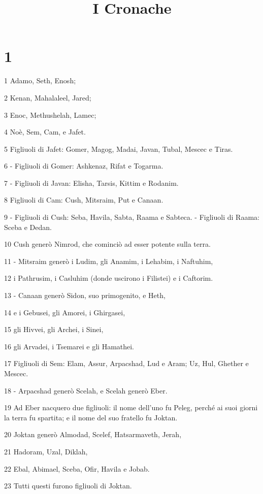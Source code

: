 

\title{I Cronache}


\chapter{1}

\par 1 Adamo, Seth, Enosh;
\par 2 Kenan, Mahalaleel, Jared;
\par 3 Enoc, Methushelah, Lamec;
\par 4 Noè, Sem, Cam, e Jafet.
\par 5 Figliuoli di Jafet: Gomer, Magog, Madai, Javan, Tubal, Mescec e Tiras.
\par 6 - Figliuoli di Gomer: Ashkenaz, Rifat e Togarma.
\par 7 - Figliuoli di Javan: Elisha, Tarsis, Kittim e Rodanim.
\par 8 Figliuoli di Cam: Cush, Mitsraim, Put e Canaan.
\par 9 - Figliuoli di Cush: Seba, Havila, Sabta, Raama e Sabteca. - Figliuoli di Raama: Sceba e Dedan.
\par 10 Cush generò Nimrod, che cominciò ad esser potente sulla terra.
\par 11 - Mitsraim generò i Ludim, gli Anamim, i Lehabim, i Naftuhim,
\par 12 i Pathrusim, i Casluhim (donde uscirono i Filistei) e i Caftorim.
\par 13 - Canaan generò Sidon, suo primogenito, e Heth,
\par 14 e i Gebusei, gli Amorei, i Ghirgasei,
\par 15 gli Hivvei, gli Archei, i Sinei,
\par 16 gli Arvadei, i Tsemarei e gli Hamathei.
\par 17 Figliuoli di Sem: Elam, Assur, Arpacshad, Lud e Aram; Uz, Hul, Ghether e Mescec.
\par 18 - Arpacshad generò Scelah, e Scelah generò Eber.
\par 19 Ad Eber nacquero due figliuoli: il nome dell'uno fu Peleg, perché ai suoi giorni la terra fu spartita; e il nome del suo fratello fu Joktan.
\par 20 Joktan generò Almodad, Scelef, Hatsarmaveth, Jerah,
\par 21 Hadoram, Uzal, Diklah,
\par 22 Ebal, Abimael, Sceba, Ofir, Havila e Jobab.
\par 23 Tutti questi furono figliuoli di Joktan.
